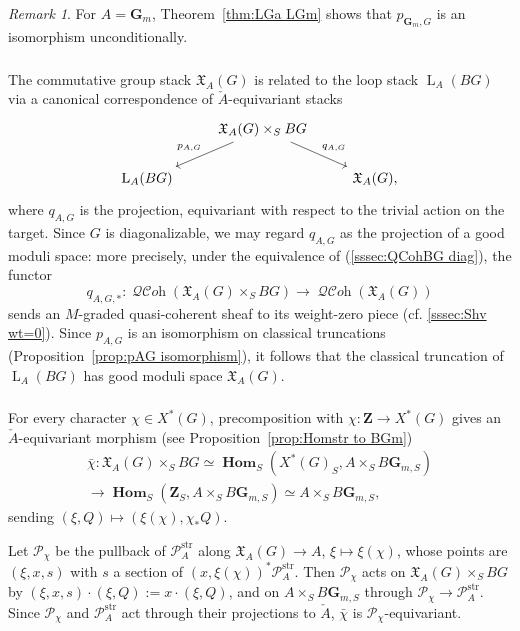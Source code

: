 \documentclass[12pt, oneside]{amsart}
\numberwithin{equation}{section}
\theoremstyle{remark}
\newtheorem{remark}[subsubsection]{Remark}
\theoremstyle{plain}
\DeclareMathOperator{\QCOH}{\mathcal{QC}\textit{oh}}
\DeclareMathOperator{\HOM}{\mathbf{Hom}}
\newcommand{\frX}{\mathfrak{X}}
\newcommand{\Loop}{\operatorname{L}}
\newcommand{\GGm}{\mathbf{G}_{m}}
\newcommand{\GGmS}{\mathbf{G}_{m,S}}
\newcommand{\bZ}{\mathbf{Z}}
\begin{document}
\begin{remark}
	For $A=\GGm$, Theorem~\ref{thm:LGa LGm} shows that $p_{\GGm,G}$ is an isomorphism unconditionally.
\end{remark}

\subsubsection{}
\label{sssec:LAG X_AG correspondence}

The commutative group stack $\frX_A(G)$ is related to the loop stack $\Loop_A(BG)$ via a canonical correspondence of $\check{A}$-equivariant stacks
\begin{equation}\label{eq:L_AG X_AG correspondence}
  \begin{tikzcd}
    & \frX_A(G) \times_S BG \ar[swap]{ld}{p_{A,G}}\ar{rd}{q_{A,G}} &
    \\
    \Loop_A(BG) & & \frX_A(G),
  \end{tikzcd}
\end{equation}
where $q_{A,G}$ is the projection, equivariant with respect to the trivial action on the target.
Since $G$ is diagonalizable, we may regard $q_{A,G}$ as the projection of a good moduli space: more precisely, under the equivalence of (\ref{sssec:QCohBG diag}), the functor
\[ q_{A,G,*} : \QCOH(\frX_A(G) \times_S BG) \to \QCOH(\frX_A(G)) \]
sends an $M$-graded quasi-coherent sheaf to its weight-zero piece (cf. \ref{sssec:Shv wt=0}).
Since $p_{A,G}$ is an isomorphism on classical truncations (Proposition~\ref{prop:pAG isomorphism}), it follows that the classical truncation of $\Loop_A(BG)$ has good moduli space $\frX_A(G)$.

\subsubsection{}\label{sssec:O(chi)}

For every character $\chi \in X^*(G)$, precomposition with $\chi : \bZ \to X^*(G)$ gives an $\check{A}$-equivariant morphism (see Proposition~\ref{prop:Homstr to BGm})
\begin{multline*}
  \bar{\chi} :
  \frX_A(G) \times_S BG
  \simeq \HOM_S(X^*(G)_S, A \times_S B\GGmS)
  \\
  \to \HOM_S(\bZ_S, A \times_S B\GGmS)
  \simeq A \times_S B\GGmS,
\end{multline*}
sending $(\xi, Q) \mapsto (\xi(\chi), \chi_*Q)$.

Let $\mathcal{P}_\chi$ be the pullback of $\mathcal{P}_A^{\mathrm{str}}$ along $\frX_A(G) \to A$, $\xi \mapsto \xi(\chi)$, whose points are $(\xi,x,s)$ with $s$ a section of $(x,\xi(\chi))^*\mathcal{P}_A^{\mathrm{str}}$.
Then $\mathcal{P}_\chi$ acts on $\frX_A(G) \times_S BG$ by $(\xi,x,s)\cdot(\xi,Q) := x\cdot(\xi,Q)$, and on $A \times_S B\GGmS$ through $\mathcal{P}_\chi \to \mathcal{P}_A^{\mathrm{str}}$.
Since $\mathcal{P}_\chi$ and $\mathcal{P}_A^{\mathrm{str}}$ act through their projections to $\check{A}$, $\bar{\chi}$ is $\mathcal{P}_\chi$-equivariant.
\end{document}
